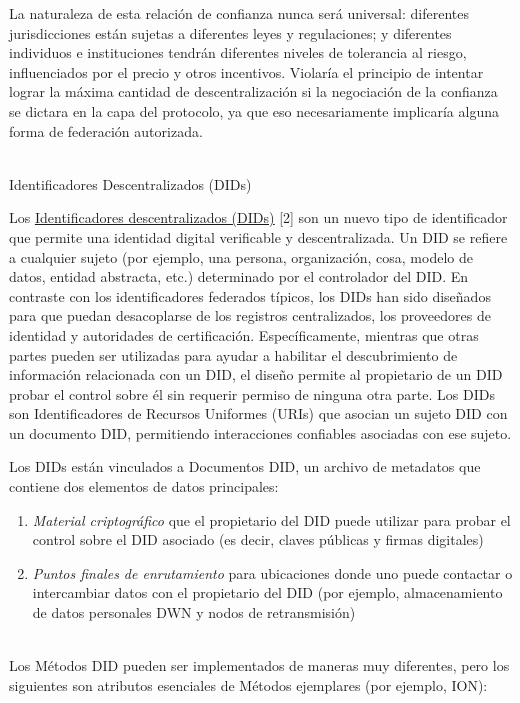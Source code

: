 \documentclass[11pt]{article}
\begin{document}
\vspace{1\baselineskip}
La naturaleza de esta relación de confianza nunca será universal: diferentes jurisdicciones están sujetas a diferentes leyes y regulaciones; y diferentes individuos e instituciones tendrán diferentes niveles de tolerancia al riesgo, influenciados por el precio y otros incentivos. Violaría el principio de intentar lograr la máxima cantidad de descentralización si la negociación de la confianza se dictara en la capa del protocolo, ya que eso necesariamente implicaría alguna forma de federación autorizada. 

{\LARGE  \\ Identificadores Descentralizados (DIDs)}

\vspace{1\baselineskip}
Los \href{https://www.w3.org/TR/did-core}{\uline{\textcolor[HTML]{1155CC}{Identificadores descentralizados (DIDs)}}} [2] son un nuevo tipo de identificador que permite una identidad digital verificable y descentralizada. Un DID se refiere a cualquier sujeto (por ejemplo, una persona, organización, cosa, modelo de datos, entidad abstracta, etc.) determinado por el controlador del DID. En contraste con los identificadores federados típicos, los DIDs han sido diseñados para que puedan desacoplarse de los registros centralizados, los proveedores de identidad y autoridades de certificación. Específicamente, mientras que otras partes pueden ser utilizadas para ayudar a habilitar el descubrimiento de información relacionada con un DID, el diseño permite al propietario de un DID probar el control sobre él sin requerir permiso de ninguna otra parte. Los DIDs son Identificadores de Recursos Uniformes (URIs) que asocian un sujeto DID con un documento DID, permitiendo interacciones confiables asociadas con ese sujeto.

\vspace{1\baselineskip}
Los DIDs están vinculados a Documentos DID, un archivo de metadatos que contiene dos elementos de datos principales: \\ 

\begin{enumerate}
	\item \textit{Material criptográfico} que el propietario del DID puede utilizar para probar el control sobre el DID asociado (es decir, claves públicas y firmas digitales) 

	\item \textit{Puntos finales de enrutamiento} para ubicaciones donde uno puede contactar o intercambiar datos con el propietario del DID (por ejemplo, almacenamiento de datos personales DWN y nodos de retransmisión)

\end{enumerate}
 \\ Los Métodos DID pueden ser implementados de maneras muy diferentes, pero los siguientes son atributos esenciales de Métodos ejemplares (por ejemplo, ION): \\ 
\end{document}
